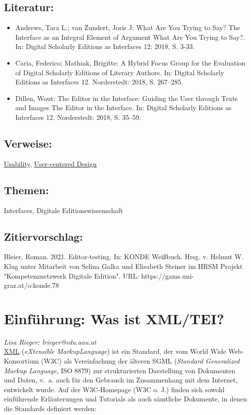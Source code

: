 \documentclass{article}
\begin{document}
        \subsection*{Literatur:}\begin{itemize}\item Andrews, Tara L.; van Zundert, Joris J: What Are You Trying to Say? The Interface as an Integral
                              Element of Argument What Are You Trying to Say?. In: Digital Scholarly Editions as Interfaces 12: 2018, S. 3-33.\item Caria, Federico; Mathiak, Brigitte: A Hybrid Focus Group for the Evaluation of Digital
                              Scholarly Editions of Literary Authors. In: Digital Scholarly Editions as Interfaces 12. Norderstedt: 2018, S. 267–285.\item Dillen, Wout: The Editor in the Interface: Guiding the User through
                              Texts and Images The Editor in the Interface. In: Digital Scholarly Editions as Interfaces 12. Norderstedt: 2018, S. 35–59.\end{itemize}\subsection*{Verweise:}\href{https://gams.uni-graz.at/o:konde.205}{Usability}, \href{https://gams.uni-graz.at/o:konde.207}{User-centered Design}\subsection*{Themen:}Interfaces, Digitale Editionswissenschaft\subsection*{Zitiervorschlag:}Bleier, Roman. 2021. Editor-testing. In: KONDE Weißbuch. Hrsg. v. Helmut W. Klug unter Mitarbeit von Selina Galka und Elisabeth Steiner im HRSM Projekt "Kompetenznetzwerk Digitale Edition". URL: https://gams.uni-graz.at/o:konde.78\newpage\section*{Einführung: Was ist XML/TEI?} \emph{Lisa Rieger; lrieger@edu.aau.at }\\
        
    \href{http://gams.uni-graz.at/o:konde.215}{XML} (\emph{eXtensible }\emph{Markup}\emph{Language}) ist ein Standard, der vom World Wide
                  Web-Konsortium (W3C) als Vereinfachung der älteren SGML (\emph{Standard Generalized Markup Language}, ISO 8879) zur strukturierten
                  Darstellung von Dokumenten und Daten, v. a. auch für den Gebrauch im Zusammenhang
                  mit dem Internet, entwickelt wurde. Auf der W3C-Homepage (W3C o. J.)
                  finden sich sowohl einführende Erläuterungen und Tutorials als auch sämtliche
                  Dokumente, in denen die Standards definiert werden:\\
            
\end{document}
